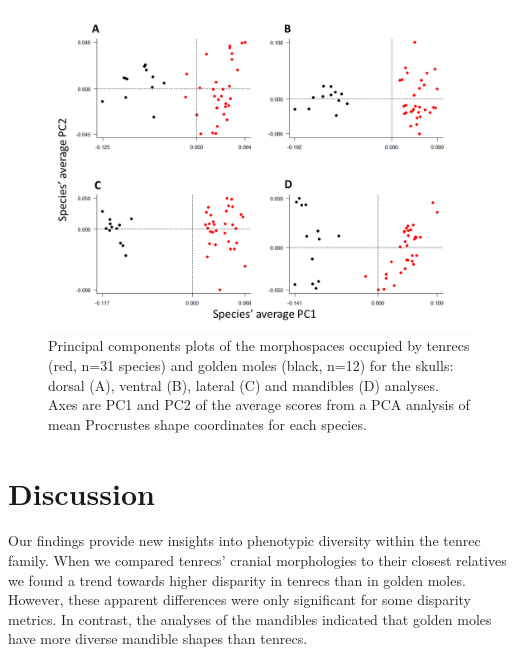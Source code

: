 \documentclass[12pt,a4paper]{article}
\begin{document}
	\begin{figure}[H]
	\centering
	\includegraphics[width=1\linewidth]{figures/FourPlotPCA.png}
	\caption[Principal components plots of the morphospaces occupied by tenrecs and golden moles]
		{Principal components plots of the morphospaces occupied by tenrecs (red, n=31 species) and golden moles (black, n=12) for the skulls: dorsal (A), ventral (B), lateral (C) and mandibles (D) analyses. Axes are PC1 and PC2 of the average scores from a PCA analysis of mean Procrustes shape coordinates for each species. }
	\label{fig:fourPCA}
	\end{figure}


\section{Discussion} 

	Our findings provide new insights into phenotypic diversity within the tenrec family. 
	When we compared tenrecs' cranial morphologies to their closest relatives we found a trend towards higher disparity in tenrecs than in golden moles. However, these apparent differences were only significant for some disparity metrics. In contrast, the analyses of the mandibles indicated that golden moles have more diverse mandible shapes than tenrecs.


\end{document}
